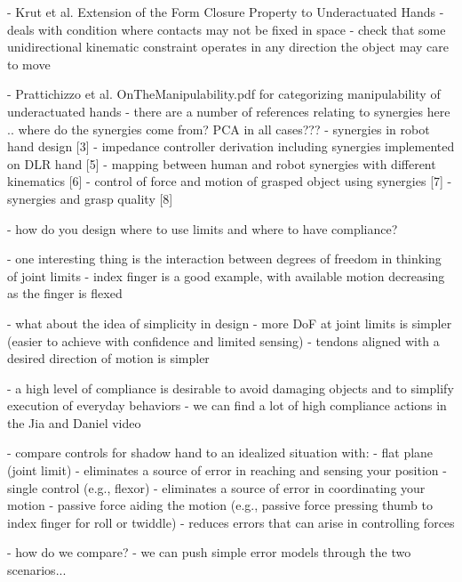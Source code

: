 		
	- Krut et al. Extension of the Form Closure Property to Underactuated Hands
		- deals with condition where contacts may not be fixed in space
		- check that some unidirectional kinematic constraint operates in any direction the object may care to move
				
	- Prattichizzo et al. OnTheManipulability.pdf for categorizing manipulability of underactuated hands
		- there are a number of references relating to synergies here .. where do the synergies come from?    PCA in all cases???
			- synergies in robot hand design [3]
			- impedance controller derivation including synergies implemented on DLR hand [5]
			- mapping between human and robot synergies with different kinematics [6]
			- control of force and motion of grasped object using synergies [7]
			- synergies and grasp quality [8]
			
	- how do you design where to use limits and where to have compliance?
		
	- one interesting thing is the interaction between degrees of freedom in thinking of joint limits
		- index finger is a good example, with available motion decreasing as the finger is flexed
		
	- what about the idea of simplicity in design
		- more DoF at joint limits is simpler (easier to achieve with confidence and limited sensing)
		- tendons aligned with a desired direction of motion is simpler
		
	- a high level of compliance is desirable to avoid damaging objects and to simplify execution of everyday behaviors
		- we can find a lot of high compliance actions in the Jia and Daniel video
		
	- compare controls for shadow hand to an idealized situation with:
		- flat plane (joint limit)
			- eliminates a source of error in reaching and sensing your position
		- single control (e.g., flexor)
			- eliminates a source of error in coordinating your motion
		- passive force aiding the motion (e.g., passive force pressing thumb to index finger for roll or twiddle)
			- reduces errors that can arise in controlling forces
			
		- how do we compare?
			- we can push simple error models through the two scenarios...
		
	
